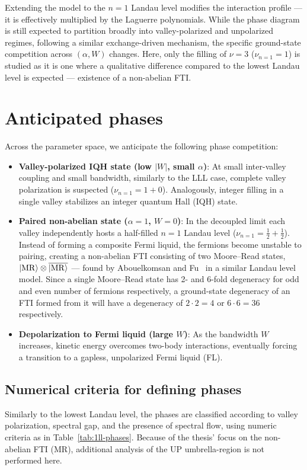 Extending the model to the $n=1$ Landau level modifies the interaction profile --- it is effectively multiplied by the Laguerre polynomials. While the phase diagram is still expected to partition broadly into valley-polarized and unpolarized regimes, following a similar exchange-driven mechanism, the specific ground-state competition across $(\alpha, W)$ changes. Here, only the filling of $\nu = 3$ ($\nu_{n=1} = 1$) is studied as it is one where a qualitative difference compared to the lowest Landau level is expected --- existence of a non-abelian FTI.

\section{Anticipated phases}
Across the parameter space, we anticipate the following phase competition:
\begin{itemize}
    \item \textbf{Valley-polarized IQH state (low $|W|$, small $\alpha$)}: At small inter-valley coupling and small bandwidth, similarly to the LLL case, complete valley polarization is suspected ($\nu_{n=1} = 1 + 0$). Analogously, integer filling in a single valley stabilizes an integer quantum Hall (IQH) state.
    \item \textbf{Paired non-abelian state ($\alpha = 1$, $W = 0$)}: In the decoupled limit each valley independently hosts a half-filled $n=1$ Landau level ($\nu_{n=1} = \tfrac{1}{2} + \tfrac{1}{2}$). Instead of forming a composite Fermi liquid, the fermions become unstable to pairing, creating a non-abelian FTI consisting of two Moore--Read states, $\ket{\mathrm{MR}} \otimes \overline{\ket{\mathrm{MR}}}$ --- found by Abouelkomsan and Fu~\cite{abouelkomsan2025non} in a similar Landau level model. Since a single Moore--Read state has 2- and 6-fold degeneracy for odd and even number of fermions respectively, a ground-state degeneracy of an FTI formed from it will have a degeneracy of $2\cdot2 = 4$ or $6\cdot 6 = 36$ respectively. %
    \item \textbf{Depolarization to Fermi liquid (large $W$)}: As the bandwidth $W$ increases, kinetic energy overcomes two-body interactions, eventually forcing a transition to a gapless, unpolarized Fermi liquid (FL).
\end{itemize}

\subsection{Numerical criteria for defining phases}
Similarly to the lowest Landau level, the phases are classified according to valley polarization, spectral gap, and the presence of spectral flow, using numeric criteria as in Table~\ref{tab:1ll-phases}. Because of the thesis' focus on the non-abelian FTI (MR), additional analysis of the UP umbrella-region is not performed here.


